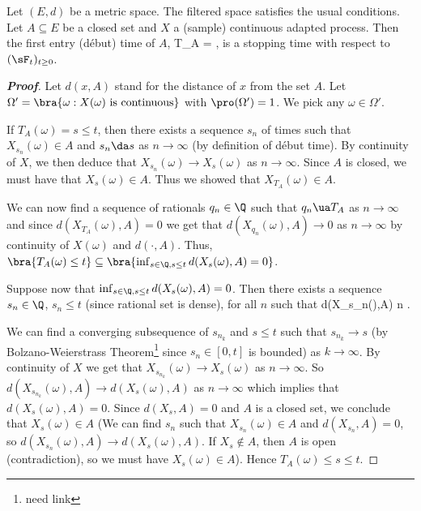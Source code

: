 \begin{proposition}\label{pro:debut_time_closed_set_stopping_time}%
Let $(E,d)$ be a metric space. The filtered space satisfies the usual conditions. Let $A\subseteq E$ be a closed set and $X$ a (sample) continuous adapted process. Then the first entry (d\'ebut) time of $A$, \be T_A = \inf{}, \ee is a stopping time with respect to $(\sF_t)_{t\geq 0}$.
\end{proposition}

\begin{proof}[\bf Proof]
Let $d(x,A)$ stand for the distance of $x$ from the set $A$. Let $\Omega' = \bra{\omega:X(\omega)\text{ is continuous}}$ with $\pro(\Omega') = 1$. We pick any $\omega \in \Omega'$.

If $T_A(\omega) = s \leq t$, then there exists a sequence $s_n$ of times such that $X_{s_n}(\omega) \in A$ and $s_n \da s$ as $n \to \infty$ (by definition of d\'ebut time). By continuity of $X$, we then deduce that $X_{s_n}(\omega) \to X_s(\omega)$ as $n\to \infty$. Since $A$ is closed, we must have that $X_s(\omega) \in A$. Thus we showed that $X_{T_A}(\omega) \in A$.

We can now find a sequence of rationals $q_n \in \Q$ such that $q_n \ua T_A$ as $n \to \infty$ and since $d(X_{T_A}(\omega),A) = 0$ we get that $d(X_{q_n}(\omega),A) \to 0$ as $n \to \infty$ by continuity of $X(\omega)$ and $d(\cdot,A)$. Thus, $\bra{T_A(\omega) \leq t} \subseteq \bra{\inf_{s\in \Q,s\leq t} d(X_s(\omega),A) = 0}$.

Suppose now that $\inf_{s\in \Q,s\leq t} d(X_s(\omega),A) = 0$. Then there exists a sequence $s_n \in \Q$, $s_n \leq t$ (since rational set is dense), for all $n$ such that
\be
d(X_{s_n}(\omega),A)  n \to \infty.
\ee

We can find a converging subsequence of $s_{n_k}$ and $s\leq t$ such that $s_{n_k} \to s$ (by Bolzano-Weierstrass Theorem\footnote{need link} since $s_n \in [0,t]$ is bounded) as $k \to \infty$. By continuity of $X$ we get that $X_{s_{n_k}}(\omega) \to X_s(\omega)$ as $n \to\infty$. So $d(X_{s_{n_k}}(\omega),A) \to d(X_s(\omega),A)$ as $n \to\infty$ which implies that $d(X_s(\omega),A) = 0$. Since $d(X_s,A) = 0$ and $A$ is a closed set, we conclude that $X_s(\omega) \in A$ (We can find $s_n$ such that $X_{s_n}(\omega)\in A$ and $d(X_{s_n},A) = 0$, so $d(X_{s_n}(\omega),A) \to d(X_s(\omega),A)$. If $X_s \notin A$, then $A$ is open (contradiction), so we must have $X_s(\omega)\in A$). Hence $T_A(\omega) \leq s \leq t$.


\end{proof}
